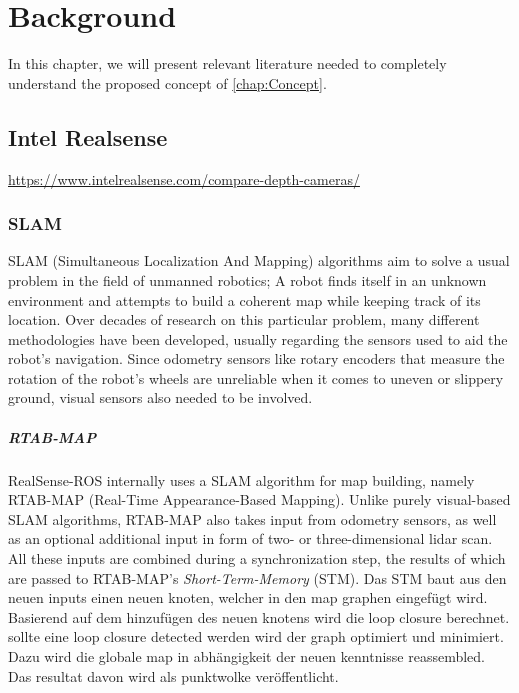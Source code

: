 \documentclass[main.tex]{subfiles}
\begin{document}
\chapter{Background}\label{chap:Background}
In this chapter, we will present relevant literature needed to completely understand the proposed concept of \autoref{chap:Concept}.


\section{Intel Realsense}
\href{https://www.intelrealsense.com/compare-depth-cameras/}{https://www.intelrealsense.com/compare-depth-cameras/}

\subsection*{SLAM}
SLAM (Simultaneous Localization And Mapping) algorithms aim to solve a usual problem in the field of unmanned robotics;
A robot finds itself in an unknown environment and attempts to build a coherent map while keeping track of its location.
Over decades of research on this particular problem, many different methodologies have been developed, usually regarding the sensors used to aid the robot's navigation.
Since odometry sensors like rotary encoders that measure the rotation of the robot's wheels are unreliable when it comes to uneven or slippery ground, visual sensors also needed to be involved.

\paragraph*{RTAB-MAP}
RealSense-ROS internally uses a SLAM algorithm for map building, namely RTAB-MAP (Real-Time Appearance-Based Mapping)\cite{Labbé_Michaud_2019}.
Unlike purely visual-based SLAM algorithms, RTAB-MAP also takes input from odometry sensors, as well as an optional additional input in form of two- or three-dimensional 
lidar scan.
All these inputs are combined during a synchronization step, the results of which are passed to RTAB-MAP's \textit{Short-Term-Memory} (STM).
 Das STM baut aus den neuen inputs einen neuen knoten, welcher in den map graphen eingefügt wird. Basierend auf dem hinzufügen des neuen knotens wird die loop closure 
 berechnet. sollte eine loop closure detected werden wird der graph optimiert und minimiert. 
Dazu wird die globale map in abhängigkeit der neuen kenntnisse reassembled. Das resultat davon wird als punktwolke veröffentlicht.
\end{document}

